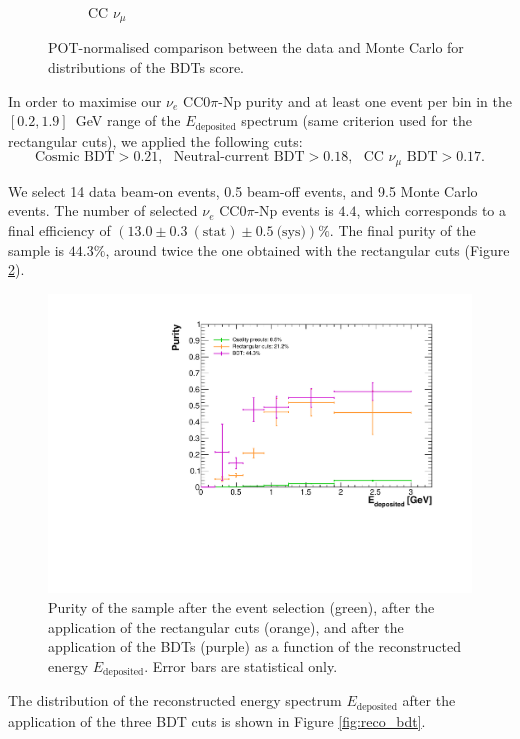 \begin{figure}[htbp]
\begin{subfigure}{0.32\textwidth}
    \caption{CC $\nu_{\mu}$} 
  \end{subfigure}
  \caption{POT-normalised comparison between the data and Monte Carlo for distributions of the BDTs score.}\label{fig:bdt_datamc}
\end{figure}

In order to maximise our $\nu_e$ CC0$\pi$-Np purity and at least one event per bin in the $[0.2,1.9]$~GeV range of the $E_{\mathrm{deposited}}$ spectrum (same criterion used for the rectangular cuts), we applied the following cuts:
\begin{equation}
    \text{Cosmic BDT} > 0.21,~~~\text{Neutral-current BDT} > 0.18,~~~\text{CC }\nu_{\mu}\text{ BDT} > 0.17.
\end{equation}

We select 14 data beam-on events, 0.5 beam-off events, and 9.5 Monte Carlo events. The number of selected $\nu_e$ CC0$\pi$-Np events is $4.4$, which corresponds to a final efficiency of $(13.0\pm0.3~\mathrm{(stat)}\pm0.5~\text{(sys)})\%$. The final purity of the sample is $44.3\%$, around twice the one obtained with the rectangular cuts (Figure \ref{fig:purity_bdt}).

\begin{figure}[htbp]
\centering
  \includegraphics[width=0.75\linewidth]{figures/purity_bdt.pdf}
  \caption{Purity of the sample after the event selection (green), after the application of the rectangular cuts (orange), and after the application of the BDTs (purple) as a function of the reconstructed energy $E_{\mathrm{deposited}}$. Error bars are statistical only.}\label{fig:purity_bdt}
\end{figure}

The distribution of the reconstructed energy spectrum $E_{\mathrm{deposited}}$ after the application of the three BDT cuts is shown in Figure \ref{fig:reco_bdt}. 

